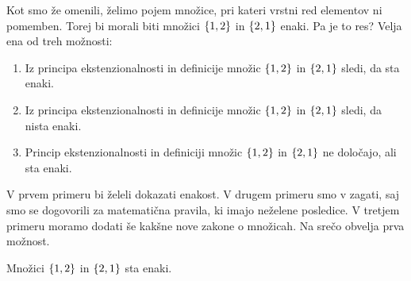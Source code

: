 Kot smo že omenili, želimo pojem množice, pri kateri vrstni red elementov ni pomemben.
Torej bi morali biti množici $\set{1, 2}$ in $\set{2, 1}$ enaki. Pa je to res? Velja ena
od treh možnosti:
%
\begin{enumerate}
\item Iz principa ekstenzionalnosti in definicije množic $\set{1, 2}$ in $\set{2, 1}$ sledi, da sta enaki.
\item Iz principa ekstenzionalnosti in definicije množic $\set{1, 2}$ in $\set{2, 1}$ sledi, da nista enaki.
\item Princip ekstenzionalnosti in definiciji množic $\set{1, 2}$ in $\set{2, 1}$ ne določajo, ali sta enaki.
\end{enumerate}
%
V prvem primeru bi želeli dokazati enakost. V drugem primeru smo v zagati, saj smo se
dogovorili za matematična pravila, ki imajo neželene posledice. V tretjem primeru moramo
dodati še kakšne nove zakone o množicah. Na srečo obvelja prva možnost.

\begin{trditev}
  Množici $\set{1, 2}$ in $\set{2, 1}$ sta enaki.
\end{trditev}

